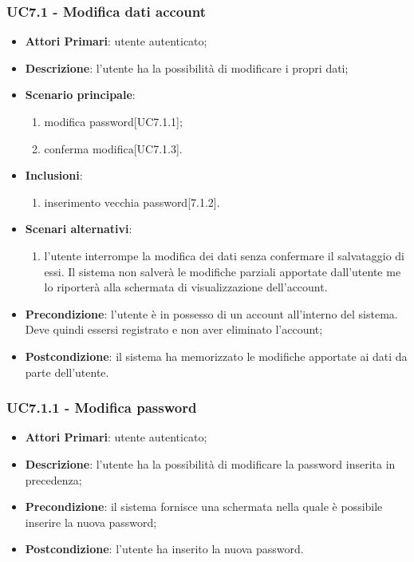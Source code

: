 \subsubsection{UC7.1 - Modifica dati account}
\begin{itemize}
	\item \textbf{Attori Primari}: utente autenticato;
	\item \textbf{Descrizione}: l'utente ha la possibilità di modificare i propri dati;
	\item \textbf{Scenario principale}:
	\begin{enumerate}
	\item modifica  password[UC7.1.1];
	\item conferma modifica[UC7.1.3].
	\end{enumerate}
	\item \textbf{Inclusioni}:
	\begin{enumerate}
	\item inserimento vecchia password[7.1.2].
	\end{enumerate}
	\item \textbf{Scenari alternativi}:
	\begin{enumerate}
	\item l'utente interrompe la modifica dei dati senza confermare il salvataggio di essi. Il sistema non salverà le modifiche parziali apportate dall'utente me lo riporterà alla schermata di visualizzazione dell'account.
	\end{enumerate}	 
	\item \textbf{Precondizione}: l'utente è in possesso di un account all'interno del sistema. Deve quindi essersi registrato e non aver eliminato l'account;
	\item \textbf{Postcondizione}: il sistema ha memorizzato le modifiche apportate ai dati da parte dell’utente.
\end{itemize}

\subsubsection{UC7.1.1 - Modifica password}
\begin{itemize}
	\item \textbf{Attori Primari}: utente autenticato;
	\item \textbf{Descrizione}: l'utente ha la possibilità di modificare la password inserita in precedenza;
	\item \textbf{Precondizione}: il sistema fornisce una schermata nella quale è possibile inserire la nuova password;
	\item \textbf{Postcondizione}: l'utente ha inserito la nuova password.
\end{itemize}

